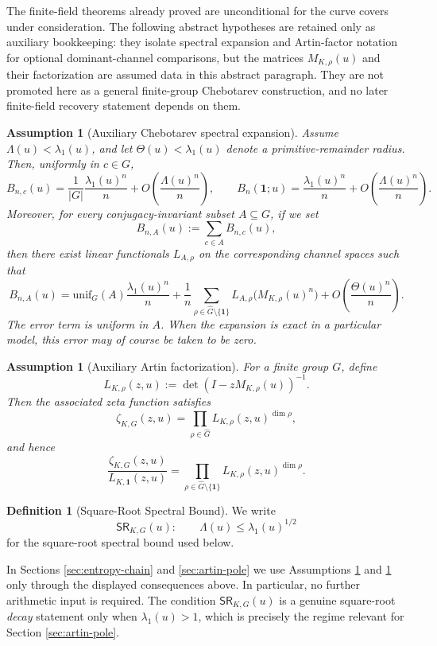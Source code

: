 \documentclass[12pt,a4paper]{article}
\theoremstyle{plain}
\newtheorem{assumption}[theorem]{Assumption}
\theoremstyle{definition}
\newtheorem{definition}[theorem]{Definition}
\numberwithin{equation}{section}
\newcommand{\ind}{\mathbf{1}}
\begin{document}
The finite-field theorems already proved are unconditional for the curve covers under consideration.  The following abstract hypotheses are retained only as auxiliary bookkeeping: they isolate spectral expansion and Artin-factor notation for optional dominant-channel comparisons, but the matrices \(M_{K,\rho}(u)\) and their factorization are assumed data in this abstract paragraph.  They are not promoted here as a general finite-group Chebotarev construction, and no later finite-field recovery statement depends on them.

\begin{assumption}[Auxiliary Chebotarev spectral expansion]\label{thm:kernel-chebotarev-exp}
Assume \(\Lambda(u)<\lambda_1(u)\), and let \(\Theta(u)<\lambda_1(u)\) denote a primitive-remainder radius. Then, uniformly in \(c\in G\),
\[
B_{n,c}(u)
=
\frac{1}{|G|}\frac{\lambda_1(u)^n}{n}
+O\!\left(\frac{\Lambda(u)^n}{n}\right),
\qquad
B_n(\ind;u)
=
\frac{\lambda_1(u)^n}{n}
+O\!\left(\frac{\Lambda(u)^n}{n}\right).
\]
Moreover, for every conjugacy-invariant subset \(A\subseteq G\), if we set
\[
B_{n,A}(u):=\sum_{c\in A}B_{n,c}(u),
\]
then there exist linear functionals \(L_{A,\rho}\) on the corresponding channel spaces such that
\[
B_{n,A}(u)
=
\mathrm{unif}_G(A)\frac{\lambda_1(u)^n}{n}
+\frac{1}{n}\sum_{\rho\in\widehat G\setminus\{\ind\}}L_{A,\rho}\!\bigl(M_{K,\rho}(u)^n\bigr)
+O\!\left(\frac{\Theta(u)^n}{n}\right).
\]
The error term is uniform in \(A\). When the expansion is exact in a particular model, this error may of course be taken to be zero.
\end{assumption}

\begin{assumption}[Auxiliary Artin factorization]\label{prop:kernel-artin-factorization}
For a finite group \(G\), define
\[
L_{K,\rho}(z,u):=\det(I-zM_{K,\rho}(u))^{-1}.
\]
Then the associated zeta function satisfies
\[
\zeta_{K,G}(z,u)=\prod_{\rho\in\widehat G}L_{K,\rho}(z,u)^{\dim\rho},
\]
and hence
\[
\frac{\zeta_{K,G}(z,u)}{L_{K,\ind}(z,u)}
=
\prod_{\rho\in\widehat G\setminus\{\ind\}}L_{K,\rho}(z,u)^{\dim\rho}.
\]
\end{assumption}

\begin{definition}[Square-Root Spectral Bound]\label{def:kernel-rh}
We write
\[
\textsf{SR}_{K,G}(u):\qquad \Lambda(u)\le \lambda_1(u)^{1/2}
\]
for the square-root spectral bound used below.
\end{definition}

In Sections \ref{sec:entropy-chain} and \ref{sec:artin-pole} we use Assumptions \ref{thm:kernel-chebotarev-exp} and \ref{prop:kernel-artin-factorization} only through the displayed consequences above. In particular, no further arithmetic input is required. The condition \(\textsf{SR}_{K,G}(u)\) is a genuine square-root \emph{decay} statement only when \(\lambda_1(u)>1\), which is precisely the regime relevant for Section \ref{sec:artin-pole}\!.
\end{document}
